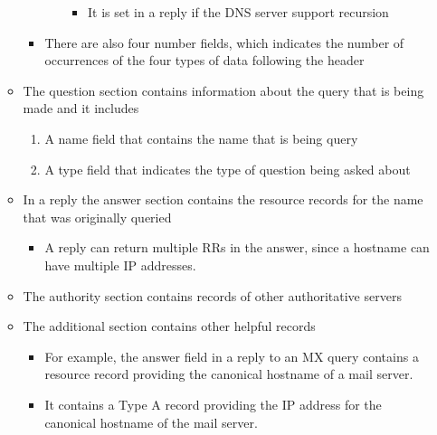 \documentclass[11pt]{article}
\providecommand{\tightlist}{%
      \setlength{\itemsep}{0pt}\setlength{\parskip}{0pt}}
\begin{document}
\begin{itemize}
\begin{itemize}
\begin{itemize}
\begin{itemize}
        \begin{itemize}
        \tightlist
        \item
          It is set in a reply if the DNS server support recursion
        \end{itemize}
      \end{itemize}
    \item
      There are also four number fields, which indicates the number of
      occurrences of the four types of data following the header
    \end{itemize}
  \item
    The question section contains information about the query that is
    being made and it includes

    \begin{enumerate}
    \def\labelenumi{\arabic{enumi}.}
    \tightlist
    \item
      A name field that contains the name that is being query
    \item
      A type field that indicates the type of question being asked about
    \end{enumerate}
  \item
    In a reply the answer section contains the resource records for the
    name that was originally queried

    \begin{itemize}
    \tightlist
    \item
      A reply can return multiple RRs in the answer, since a hostname
      can have multiple IP addresses.
    \end{itemize}
  \item
    The authority section contains records of other authoritative
    servers
  \item
    The additional section contains other helpful records

    \begin{itemize}
    \tightlist
    \item
      For example, the answer field in a reply to an MX query contains a
      resource record providing the canonical hostname of a mail server.
    \item
      It contains a Type A record providing the IP address for the
      canonical hostname of the mail server.
    \end{itemize}
  \end{itemize}
\end{itemize}


    
    
    
    
\end{document}
